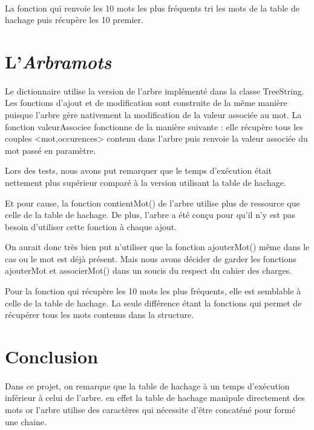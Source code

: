 \documentclass[12pt,a4paper,final]{article}
\begin{document}
	\paragraph{}{La fonction qui renvoie les 10 mots les plus fréquents tri les mots de la table de hachage puis récupère les 10 premier.}
	
	
\newpage 

\section{L'\emph{Arbramots}}

	\paragraph{}{
Le dictionnaire utilise la version de l'arbre implémenté dans la classe TreeString.
Les fonctions d'ajout et de modification sont construite de la même manière puisque l'arbre gère nativement la modification de la valeur associée au mot.
La fonction valeurAssociee fonctionne de la manière suivante : elle récupère tous les couples <mot,occurences> contenu dans l'arbre puis renvoie la valeur associée du mot passé en paramètre.

Lors des tests, nous avons put remarquer que le temps d’exécution était nettement plus supérieur comparé à la version utilisant la table de hachage. 

Et pour cause, la fonction contientMot() de l'arbre utilise plus de ressource que celle de la table de hachage. De plus, l'arbre a été conçu pour qu'il n'y est pas besoin d'utiliser cette fonction à chaque ajout. 

On aurait donc très bien put n'utiliser que la fonction ajouterMot() même dans le cas ou le mot est déjà présent. Mais nous avons décider de garder les fonctions ajouterMot et associerMot() dans un soucis du respect du cahier des charges.

Pour la fonction qui récupère les 10 mots les plus fréquents, elle est semblable à celle de la table de hachage. La seule différence étant la fonctions qui permet de récupérer tous les mots contenus dans la structure.
}
\newpage
  
\section*{Conclusion}
\paragraph{}{
Dans ce projet, on remarque que la table de hachage à un temps d'exécution inférieur à celui de l'arbre. en effet la table de hachage manipule directement des mots or l'arbre utilise des caractères qui nécessite d'être concaténé pour formé une chaine. 
}
\end{document}
